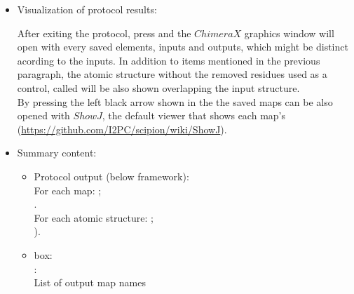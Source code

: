 \begin{itemize}
  \item Visualization of protocol results:
  
  After exiting the protocol, press  and the $ChimeraX$ graphics window will open with every saved elements, inputs and outputs, which might be distinct acording to the inputs. In addition to items mentioned in the previous paragraph, the atomic structure without the removed residues used as a control, called  will be also shown overlapping the input structure.\\
  
  By pressing the left black arrow shown in the  the saved maps can be also opened with $ShowJ$, the default \scipion viewer that shows each map's  (\url{https://github.com/I2PC/scipion/wiki/ShowJ}).
   
   \item Summary content:
    
    \begin{itemize}
     \item Protocol output (below \scipion framework):\\
     For each map: ;\\ .\\
     For each atomic structure: ;\\ ).\\
     \item {} box:\\:\\List of output map names\\  
    \end{itemize}
  
  \end{itemize}


